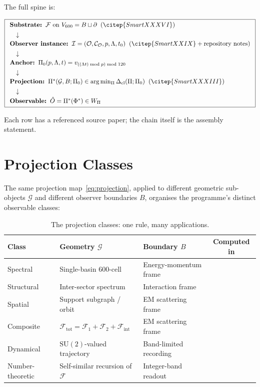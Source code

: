 \documentclass[12pt]{article}
\newcommand{\Fcal}{\mathcal{F}}
\newcommand{\Gcal}{\mathcal{G}}
\newcommand{\Ocal}{\mathcal{O}}
\newcommand{\Ical}{\mathcal{I}}
\newcommand{\Ccal}{\mathcal{C}}
\newcommand{\Dcl}{\Delta_{\mathrm{cl}}}
\begin{document}
The full spine is:

\begin{equation*}
\boxed{
\begin{array}{l}
\textbf{Substrate:} \;\; \Fcal \text{ on } V_{600} = B \sqcup \partial \;\;(\citep{SmartXXXVI})\\[4pt]
\quad\downarrow\\[2pt]
\textbf{Observer instance:} \;\; \Ical = (\Ocal, \Ccal_\Ocal, p, \Lambda, t_0) \;\;(\citep{SmartXXIX} + \text{repository notes})\\[4pt]
\quad\downarrow\\[2pt]
\textbf{Anchor:} \;\; \Pi_0(p, \Lambda, t) = v_{((\Lambda t) \bmod p) \bmod 120}\\[4pt]
\quad\downarrow\\[2pt]
\textbf{Projection:} \;\; \Pi^*(\Gcal, B; \Pi_0) \in \arg\min_\Pi \Dcl(\Pi; \Pi_0) \;\;(\citep{SmartXXXIII})\\[4pt]
\quad\downarrow\\[2pt]
\textbf{Observable:} \;\; \hat O = \Pi^*(\Phi^*) \in W_\Pi
\end{array}}
\end{equation*}

Each row has a referenced source paper; the chain itself is the assembly statement.

\section{Projection Classes}\label{sec:classes}

The same projection map~\eqref{eq:projection}, applied to different geometric sub-objects $\Gcal$ and different observer boundaries $B$, organises the programme's distinct observable classes:

\begin{table}[ht]
\centering
\caption{The projection classes: one rule, many applications.}
\label{tab:classes}
\begin{tabular}{@{}lllc@{}}
\toprule
Class & Geometry $\Gcal$ & Boundary $B$ & Computed in \\
\midrule
Spectral & Single-basin 600-cell & Energy-momentum frame & \citep{SmartV} \\
Structural & Inter-sector spectrum & Interaction frame & \citep{SmartXXII} \\
Spatial & Support subgraph / orbit & EM scattering frame & \citep{SmartXXXII} \\
Composite & $\Fcal_{\text{tot}} = \Fcal_1 + \Fcal_2 + \Fcal_{\text{int}}$ & EM scattering frame & \citep{SmartXXXII} \\
Dynamical & $\mathrm{SU}(2)$-valued trajectory & Band-limited recording & \citep{H4Coxeter2026} \\
Number-theoretic & Self-similar recursion of $\Fcal$ & Integer-band readout & \citep{SmartRHFormal} \\
\bottomrule
\end{tabular}
\end{table}
\end{document}
